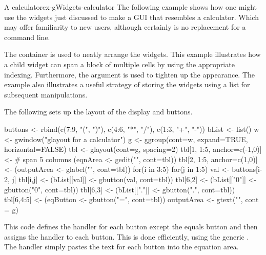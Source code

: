 \begin{example}{A calculator}{ex-gWidgets-calculator}
The following example shows how one might use the widgets just
discussed to make a GUI that resembles a calculator. Which may offer
familiarity to new \R\/ users, although certainly is no replacement
for a command line.

The  container is used to neatly arrange the
widgets. This example illustrates how a child widget can span a block
of multiple cells by using the appropriate indexing. Furthermore, the
 argument is used to tighten up the appearance. The
example also illustrates a useful strategy of storing the widgets
using a list for subsequent manipulations.

The following sets up the layout of the display and buttons.
\begin{Schunk}
\begin{Sinput}
 buttons <- rbind(c(7:9, "(", ")"),
                  c(4:6, "*", "/"),
                  c(1:3, "+", "-"))
 bList <- list()
 w <- gwindow("glayout for a calculator")
 g <- ggroup(cont=w, expand=TRUE, horizontal=FALSE)
 tbl <- glayout(cont=g, spacing=2)
 tbl[1, 1:5, anchor=c(-1,0)] <-          # span 5 columns
   (eqnArea <- gedit("", cont=tbl))
 tbl[2, 1:5, anchor=c(1,0)] <- 
   (outputArea <- glabel("", cont=tbl))
 for(i in 3:5) {
   for(j in 1:5) {
     val <- buttons[i-2, j]
     tbl[i,j] <- (bList[[val]] <- gbutton(val, cont=tbl))
   }
 }
 tbl[6,2] <- (bList[["0"]] <- gbutton("0", cont=tbl))
 tbl[6,3] <- (bList[["."]] <- gbutton(".", cont=tbl))
 tbl[6,4:5] <- (eqButton <- gbutton("=", cont=tbl))
 outputArea <- gtext("", cont = g)
\end{Sinput}
\end{Schunk}

This code defines the handler for each button except the equals button
and then assigns the handler to each button. This is done efficiently,
using the generic . The handler simply pastes
the text for each button into the equation area.

\begin{Schunk}
\end{Schunk}


\end{example}

